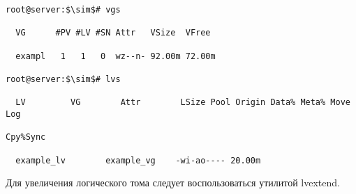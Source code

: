 \documentclass[14pt, a4paper]{article}
\begin{document}
\begin{lstlisting}
root@server:$\sim$# vgs

  VG      #PV #LV #SN Attr   VSize  VFree

  exampl   1   1   0  wz--n- 92.00m 72.00m

root@server:$\sim$# lvs

  LV         VG        Attr        LSize Pool Origin Data% Meta% Move Log

Cpy%Sync

  example_lv        example_vg    -wi-ao---- 20.00m

\end{lstlisting}
\vspace{0.2cm}

Для увеличения логического тома следует воспользоваться утилитой \colorbox{backcolour}{lvextend}.

\newpage
\end{document}
